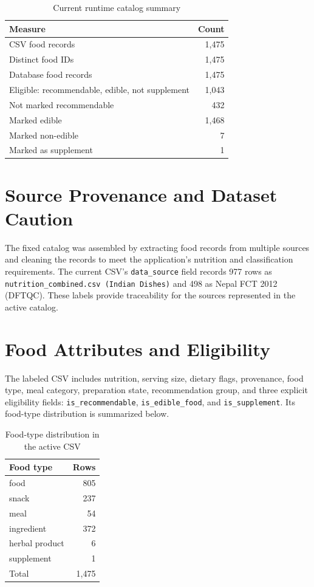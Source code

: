 \documentclass[12pt,a4paper]{report}
\begin{document}
\begin{table}[H]
\centering
\caption{Current runtime catalog summary}
\begin{tabular}{lr}
\toprule
Measure & Count\\
\midrule
CSV food records & 1,475\\
Distinct food IDs & 1,475\\
Database food records & 1,475\\
Eligible: recommendable, edible, not supplement & 1,043\\
Not marked recommendable & 432\\
Marked edible & 1,468\\
Marked non-edible & 7\\
Marked as supplement & 1\\
\bottomrule
\end{tabular}
\end{table}

\section{Source Provenance and Dataset Caution}
The fixed catalog was assembled by extracting food records from multiple sources and
cleaning the records to meet the application's nutrition and classification requirements.
The current CSV's \texttt{data\_source} field records 977 rows as
\texttt{nutrition\_combined.csv (Indian Dishes)} and 498 as Nepal FCT 2012 (DFTQC).
These labels provide traceability for the sources represented in the active catalog.

\section{Food Attributes and Eligibility}
The labeled CSV includes nutrition, serving size, dietary flags, provenance, food type,
meal category, preparation state, recommendation group, and three explicit eligibility
fields: \texttt{is\_recommendable}, \texttt{is\_edible\_food}, and
\texttt{is\_supplement}. Its food-type distribution is summarized below.

\begin{table}[H]
\centering
\caption{Food-type distribution in the active CSV}
\begin{tabular}{lr}
\toprule
Food type & Rows\\
\midrule
food & 805\\
snack & 237\\
meal & 54\\
ingredient & 372\\
herbal product & 6\\
supplement & 1\\
\midrule
Total & 1,475\\
\bottomrule
\end{tabular}
\end{table}
\end{document}
